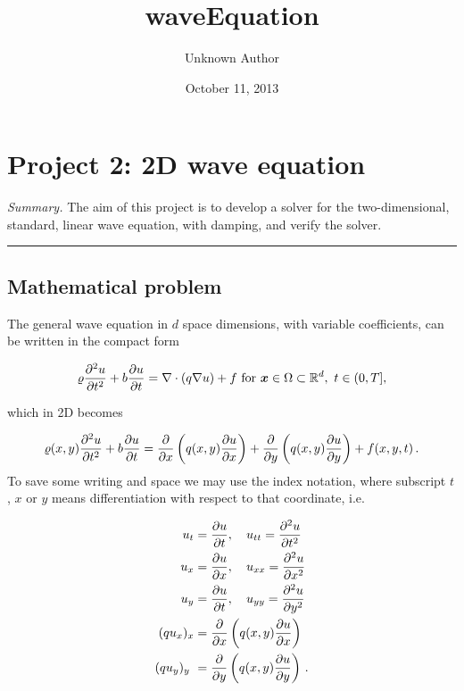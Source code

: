 \documentclass[letterpaper,10pt,english]{/usr/share/sphinx/texinputs/sphinxhowto}
\title{waveEquation}
\date{October 11, 2013}
\author{Unknown Author}
\begin{document}
        
            \maketitle
        

        


        
        \section{Project 2: 2D wave equation}

\emph{Summary.} The aim of this project is to develop a solver for the
two-dimensional, standard, linear wave equation, with damping, and
verify the solver.\begin{center}\rule{3in}{0.4pt}\end{center}

\subsection{Mathematical problem}

The general wave equation in $d$ space dimensions, with variable
coefficients, can be written in the compact form

\[
\varrho\frac{\partial^2 u}{\partial t^2} +b \frac{\partial u}{\partial t} = \nabla\cdot (q\nabla u) + f\hbox{ for }\boldsymbol{x}\in\Omega\subset\mathbb{R}^d,\ t\in (0,T],
\]

which in 2D becomes

\[
\varrho(x,y)
\frac{\partial^2 u}{\partial t^2} +b \frac{\partial u}{\partial t} =
\frac{\partial}{\partial x}\left( q(x,y)
\frac{\partial u}{\partial x}\right)
+
\frac{\partial}{\partial y}\left( q(x,y)
\frac{\partial u}{\partial y}\right)
+ f(x,y,t)
\thinspace .
\] To save some writing and space we may use the index notation, where
subscript $t$, $x$ or $y$ means differentiation with respect to that
coordinate, i.e.

\begin{align*}
u_{t} &=\frac{\partial u}{\partial t} ,
\quad u_{tt} =\frac{\partial^2 u}{\partial t^2}\\
u_{x} &=\frac{\partial u}{\partial x} ,
\quad u_{xx} =\frac{\partial^2 u}{\partial x^2}\\
u_{y} &=\frac{\partial u}{\partial t} ,
\quad u_{yy} =\frac{\partial^2 u}{\partial y^2}\\
(q u_x)_x &= \frac{\partial}{\partial x}\left( q(x,y)
\frac{\partial u}{\partial x}\right)
\\
(q u_y)_y\ &=\frac{\partial}{\partial y}\left( q(x,y)
\frac{\partial u}{\partial y}\right)
\thinspace .
\end{align*}
\end{document}
